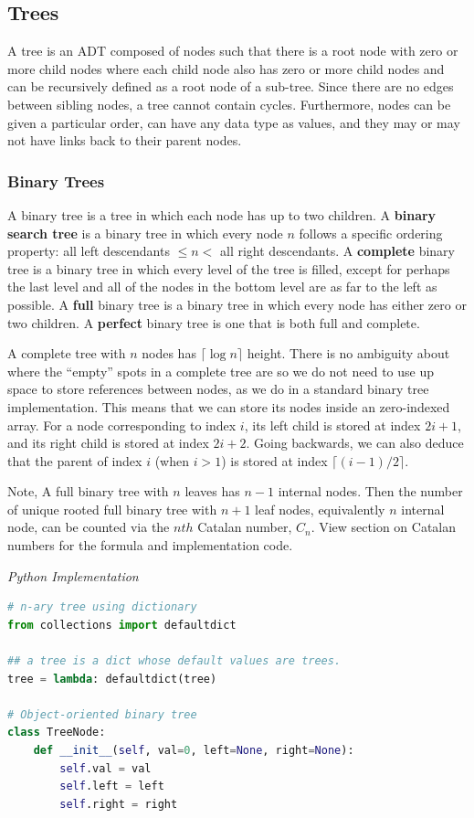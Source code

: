 \documentclass{article}
\begin{document}
    \subsection{Trees}
    A tree is an ADT composed of nodes such that there is a root node with zero or more child nodes where each child node also has zero or more child nodes and can be recursively defined as a root node of a sub-tree. Since there are no edges between sibling nodes, a tree cannot contain cycles. Furthermore, nodes can be given a particular order, can have any data type as values, and they may or may not have links back to their parent nodes.
    
    \subsubsection{Binary Trees}
    A binary tree is a tree in which each node has up to two children. A \textbf{binary search tree} is a binary tree in which every node $n$ follows a specific ordering property: all left descendants $\leq n <$ all right descendants. A \textbf{complete} binary tree is a binary tree in which every level of the tree is filled, except for perhaps the last level and all of the nodes in the bottom level are as far to the left as possible. A \textbf{full} binary tree is a binary tree in which every node has either zero or two children. A \textbf{perfect} binary tree is one that is both full and complete.
    
    A complete tree with $n$ nodes has $\lceil \log n \rceil$ height. There is no ambiguity about where the ``empty'' spots in a complete tree are so we do not need to use up space to store references between nodes, as we do in a standard binary tree implementation. This means that we can store its nodes inside an zero-indexed array. For a node corresponding to index $i$, its left child is stored at index $2i + 1$, and its right child is stored at index $2i + 2$. Going backwards, we can also deduce that the parent of index $i$ (when $i > 1$) is stored at index $\lceil (i-1)/2 \rceil$.

    Note, A full binary tree with $n$ leaves has $n - 1$ internal nodes. Then the number of unique rooted full binary tree with $n + 1$ leaf nodes, equivalently $n$ internal node, can be counted via the $nth$ Catalan number, $C_n$. View section on Catalan numbers for the formula and implementation code.

\vspace{8pt} \emph{Python Implementation}
\begin{lstlisting}[language=Python]
# n-ary tree using dictionary
from collections import defaultdict

## a tree is a dict whose default values are trees. 
tree = lambda: defaultdict(tree)

# Object-oriented binary tree
class TreeNode:
    def __init__(self, val=0, left=None, right=None):
        self.val = val
        self.left = left
        self.right = right
\end{lstlisting}
    
\end{document}
